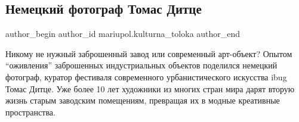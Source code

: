  
 
 
 
 

\subsection{Немецкий фотограф Томас Дитце}
\label{sec:11_02_2019.fb.mariupol.kulturna_toloka.1.nemeckij_fotograf_tomas_dittse}

\ifcmt
 author_begin
   author_id mariupol.kulturna_toloka
 author_end
\fi

Никому не нужный заброшенный завод или современный арт-объект? Опытом
\enquote{оживления} заброшенных индустриальных объектов поделился немецкий фотограф,
куратор фестиваля современного урбанистического искусства ibug Томас Дитце. Уже
более 10 лет художники из многих стран мира дарят вторую жизнь старым заводским
помещениям, превращая их в модные креативные пространства.
